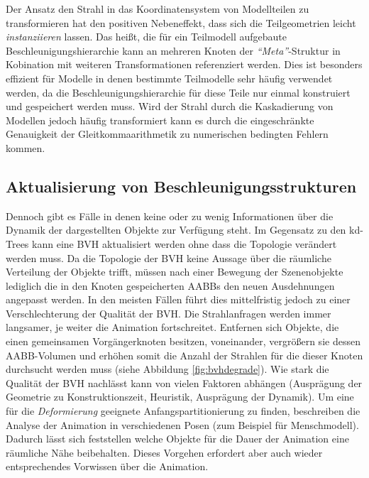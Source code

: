 Der Ansatz den Strahl in das Koordinatensystem von Modellteilen zu transformieren hat den positiven Nebeneffekt, dass sich die Teilgeometrien leicht \textit{instanziieren} lassen. Das heißt, die für ein Teilmodell aufgebaute Beschleunigungshierarchie kann an mehreren Knoten der \textit{``Meta''}-Struktur in Kobination mit weiteren Transformationen referenziert werden. Dies ist besonders effizient für Modelle in denen bestimmte Teilmodelle sehr häufig verwendet werden, da die Beschleunigungshierarchie für diese Teile nur einmal konstruiert und gespeichert werden muss. Wird der Strahl durch die Kaskadierung von Modellen jedoch häufig transformiert kann es durch die eingeschränkte Genauigkeit der Gleitkommaarithmetik zu numerischen bedingten Fehlern kommen.

\subsection{Aktualisierung von Beschleunigungsstrukturen}

Dennoch gibt es Fälle in denen keine oder zu wenig Informationen über die Dynamik der dargestellten Objekte zur Verfügung steht. Im Gegensatz zu den kd-Trees kann eine BVH aktualisiert werden ohne dass die Topologie verändert werden muss. Da die Topologie der BVH keine Aussage über die räumliche Verteilung der Objekte trifft, müssen nach einer Bewegung der Szenenobjekte lediglich die in den Knoten gespeicherten AABBs den neuen Ausdehnungen angepasst werden.
In den meisten Fällen führt dies mittelfristig jedoch zu einer Verschlechterung der Qualität der BVH. Die Strahlanfragen werden immer langsamer, je weiter die Animation fortschreitet. Entfernen sich Objekte, die einen gemeinsamen Vorgängerknoten besitzen, voneinander, vergrößern sie dessen AABB-Volumen und erhöhen somit die Anzahl der Strahlen für die dieser Knoten durchsucht werden muss (siehe Abbildung \ref{fig:bvhdegrade}).
Wie stark die Qualität der BVH nachlässt kann von vielen Faktoren abhängen (Ausprägung der Geometrie zu Konstruktionszeit, Heuristik, Ausprägung der Dynamik).
Um eine für die \textit{Deformierung} geeignete Anfangspartitionierung zu finden, beschreiben \cite{WBS07} die Analyse der Animation in verschiedenen Posen (zum Beispiel für Menschmodell). Dadurch lässt sich feststellen welche Objekte für die Dauer der Animation eine räumliche Nähe beibehalten. Dieses Vorgehen erfordert aber auch wieder entsprechendes Vorwissen über die Animation.

